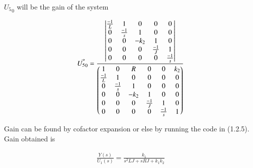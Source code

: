 \begin{enumerate}[label=\thesection.\arabic*.,ref=\thesection.\theenumi]
${U_5}_0$ will be the gain of the system

\begin{align}
    \Vec{{U_5}_0} = \frac{\begin{vmatrix}\frac{-1}{L} & 1 & 0 & 0 & 0 \\
    0 & \frac{-1}{s} & 1 & 0 & 0 \\
    0 & 0 & -k_2 & 1 & 0 \\
    0 & 0 & 0 & \frac{-1}{J} & 1 \\
    0 & 0 & 0 & 0& \frac{-1}{s} \end{vmatrix}}{ \begin{pmatrix}1 & 0 & R & 0 & 0 & k_2\\
    \frac{-1}{L} & 1 & 0 & 0 & 0 & 0\\
    0 & \frac{-1}{s} & 1 & 0 & 0 & 0\\
    0 & 0 & -k_2 & 1 & 0 & 0\\
    0 & 0 & 0 & \frac{-1}{J} & 1 & 0\\
    0 & 0 & 0 & 0& \frac{-1}{s} & 1 \end{pmatrix}}
\end{align}

Gain can be found by cofactor expansion or else by running the code in (1.2.5).
Gain obtained is 

\begin{align}
    \frac{Y(s)}{U_1(s)}=\frac{k_1}{s^2LJ+sRJ+k_1k_2}
\end{align}



\end{enumerate}